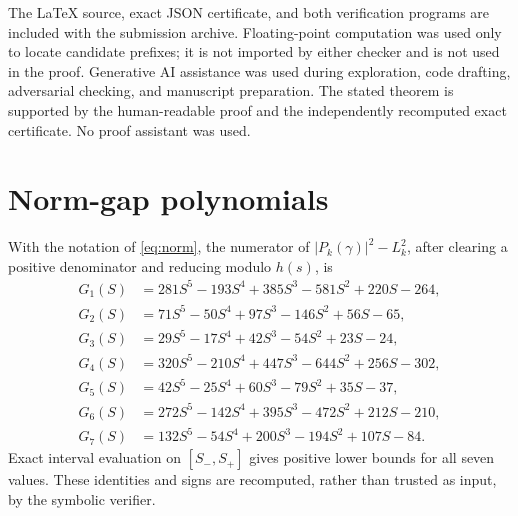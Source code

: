 \documentclass[11pt]{amsart}
\theoremstyle{definition}
\begin{document}
The LaTeX source, exact JSON certificate, and both verification programs are
included with the submission archive.  Floating-point computation was used
only to locate candidate prefixes; it is not imported by either checker and is
not used in the proof.  Generative AI assistance was used during exploration,
code drafting, adversarial checking, and manuscript preparation.  The stated
theorem is supported by the human-readable proof and the independently
recomputed exact certificate.  No proof assistant was used.

\appendix
\section{Norm-gap polynomials}\label{app:gaps}

With the notation of \eqref{eq:norm}, the numerator of
$|P_k(\gamma)|^2-L_k^2$, after clearing a positive denominator and reducing
modulo $h(s)$, is
\begin{align*}
G_1(S)&=281S^5-193S^4+385S^3-581S^2+220S-264,\\
G_2(S)&=71S^5-50S^4+97S^3-146S^2+56S-65,\\
G_3(S)&=29S^5-17S^4+42S^3-54S^2+23S-24,\\
G_4(S)&=320S^5-210S^4+447S^3-644S^2+256S-302,\\
G_5(S)&=42S^5-25S^4+60S^3-79S^2+35S-37,\\
G_6(S)&=272S^5-142S^4+395S^3-472S^2+212S-210,\\
G_7(S)&=132S^5-54S^4+200S^3-194S^2+107S-84.
\end{align*}
Exact interval evaluation on $[S_-,S_+]$ gives positive lower bounds for all
seven values.  These identities and signs are recomputed, rather than trusted
as input, by the symbolic verifier.

\clearpage
\begingroup
\sloppy


\endgroup
\end{document}
